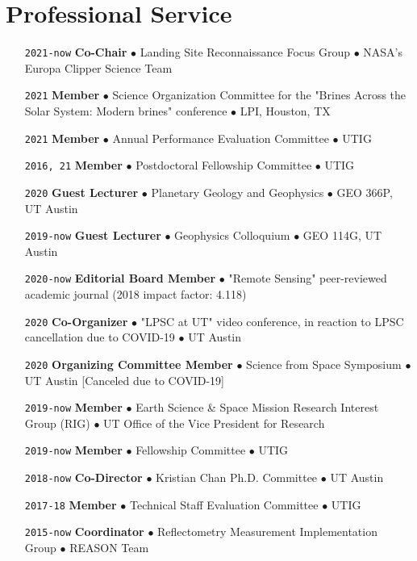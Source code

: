 \section*{Professional Service}

\begin{itemize}[leftmargin=5.8em, labelsep=1.5em]
    \setlength\itemsep{-.5em}
    \item[\texttt{2021-now}] \textbf{Co-Chair} $\bullet$ Landing Site Reconnaissance Focus Group  $\bullet$ NASA's Europa Clipper Science Team
    \item[\texttt{2021}] \textbf{Member} $\bullet$ Science Organization Committee for the "Brines Across the Solar System: Modern brines" conference $\bullet$ LPI, Houston, TX
    \item[\texttt{2021}] \textbf{Member} $\bullet$ Annual Performance Evaluation Committee $\bullet$ UTIG
    \item[\texttt{2016, 21}] \textbf{Member} $\bullet$ Postdoctoral Fellowship Committee $\bullet$ UTIG
    \item[\texttt{2020}] \textbf{Guest Lecturer} $\bullet$ Planetary Geology and Geophysics $\bullet$  GEO 366P, UT Austin 
    \item[\texttt{2019-now}] \textbf{Guest Lecturer} $\bullet$ Geophysics Colloquium $\bullet$  GEO 114G, UT Austin
    \item[\texttt{2020-now}] \textbf{Editorial Board Member} $\bullet$ "Remote Sensing" peer-reviewed academic journal (2018 impact factor: 4.118)
    \item[\texttt{2020}] \textbf{Co-Organizer} $\bullet$ "LPSC at UT" video conference, in reaction to LPSC cancellation due to COVID-19 $\bullet$ UT Austin
    \item[\texttt{2020}] \textbf{Organizing Committee Member} $\bullet$ Science from Space Symposium $\bullet$ UT Austin [Canceled due to COVID-19]
    \item[\texttt{2019-now}] \textbf{Member} $\bullet$ Earth Science \& Space Mission Research Interest Group (RIG) $\bullet$ UT Office of the Vice President for Research
    \item[\texttt{2019-now}] \textbf{Member} $\bullet$ Fellowship Committee $\bullet$ UTIG
    \item[\texttt{2018-now}] \textbf{Co-Director} $\bullet$ Kristian Chan Ph.D. Committee $\bullet$ UT Austin
    \item[\texttt{2017-18}] \textbf{Member} $\bullet$ Technical Staff Evaluation Committee $\bullet$ UTIG
    \item[\texttt{2015-now}] \textbf{Coordinator} $\bullet$ Reflectometry Measurement Implementation Group $\bullet$ REASON Team

\end{itemize}
